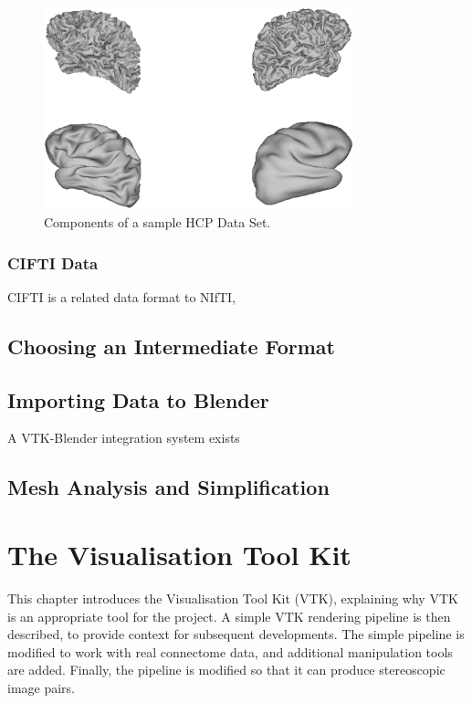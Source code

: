 \documentclass[MSc,paper=a4,pagesize=auto]{icldt}
\begin{document}
\begin{figure}[htbp!]
    \centering
    \includegraphics[width=0.8\textwidth]{resources/connectome_gifti}
    \caption{Components of a sample HCP Data Set.}
    \label{fig:connectome_gifti}
\end{figure}

\subsection{CIFTI Data}
CIFTI is a related data format to NIfTI,  

\section{Choosing an Intermediate Format}


\section{Importing Data to Blender}
A VTK-Blender integration system exists %

\section{Mesh Analysis and Simplification}

\chapter{The Visualisation Tool Kit}
This chapter introduces the Visualisation Tool Kit (VTK), explaining why VTK is an appropriate tool for the project. A simple VTK rendering pipeline is then described, to provide context for subsequent developments. The simple pipeline is modified to work with real connectome data, and additional manipulation tools are added. Finally, the pipeline is modified so that it can produce stereoscopic image pairs.
\end{document}
